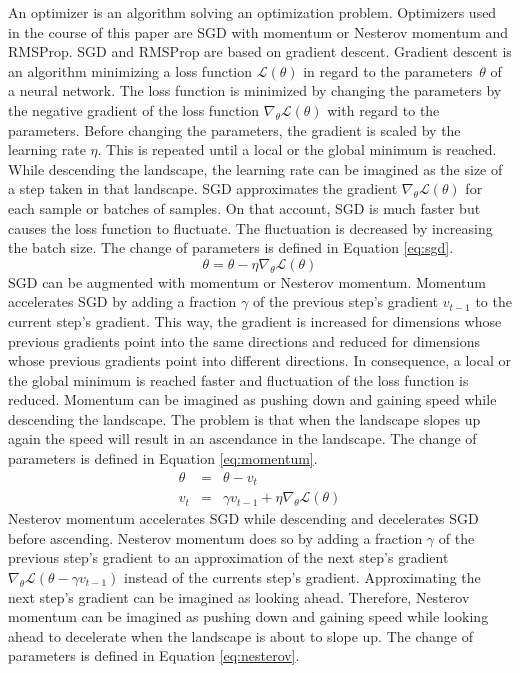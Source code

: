 An optimizer is an algorithm solving an optimization problem. Optimizers used in the course of this paper are \ac{SGD} with momentum or Nesterov momentum and \ac{RMSProp}.
%
\ac{SGD} and \ac{RMSProp} are based on gradient descent. Gradient descent is an algorithm minimizing a loss function $\mathcal{L}(\theta)$ in regard to the parameters~$\theta$ of a neural network. The loss function is minimized by changing the parameters by the negative gradient of the loss function $\nabla_{\theta} \mathcal{L}(\theta)$ with regard to the parameters. Before changing the parameters, the gradient is scaled by the learning rate $\eta$. This is repeated until a local or the global minimum is reached. While descending the landscape, the learning rate can be imagined as the size of a step taken in that landscape. \autocite{Ruder.2016}
%
\ac{SGD} approximates the gradient $\nabla_{\theta} \mathcal{L}(\theta)$ for each sample or batches of samples. On that account, \ac{SGD} is much faster but causes the loss function to fluctuate. The fluctuation is decreased by increasing the batch size. The change of parameters is defined in Equation \eqref{eq:sgd}. \autocite{Ruder.2016}
\begin{equation}
	\label{eq:sgd}
	\theta = \theta - \eta \nabla_{\theta} \mathcal{L}(\theta)
\end{equation}
%
\ac{SGD} can be augmented with momentum or Nesterov momentum.
%
Momentum accelerates \ac{SGD} by adding a fraction $\gamma$ of the previous step's gradient $v_{t-1}$ to the current step's gradient. This way, the gradient is increased for dimensions whose previous gradients point into the same directions and reduced for dimensions whose previous gradients point into different directions. In consequence, a local or the global minimum is reached faster and fluctuation of the loss function is reduced.
Momentum can be imagined as pushing down and gaining speed while descending the landscape. The problem is that when the landscape slopes up again the speed will result in an ascendance in the landscape. The change of parameters is defined in Equation \eqref{eq:momentum}. \autocite{Ruder.2016}
\begin{equation}
	\label{eq:momentum}
	\begin{array}{lcl}
		\theta & = & \theta - v_t\\
		v_t & = & \gamma v_{t-1} + \eta \nabla_{\theta} \mathcal{L}(\theta)
	\end{array}
\end{equation}
%
Nesterov momentum accelerates \ac{SGD} while descending and decelerates \ac{SGD} before ascending. Nesterov momentum does so by adding a fraction $\gamma$ of the previous step's gradient to an approximation of the next step's gradient $\nabla_{\theta} \mathcal{L}(\theta - \gamma v_{t-1})$ instead of the currents step's gradient. Approximating the next step's gradient can be imagined as looking ahead. Therefore, Nesterov momentum can be imagined as pushing down and gaining speed while looking ahead to decelerate when the landscape is about to slope up. The change of parameters is defined in Equation \eqref{eq:nesterov}. \autocite{Ruder.2016}
